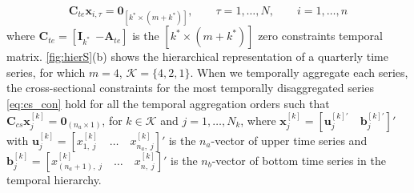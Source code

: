 \documentclass[12pt]{article}
\newcommand{\bvet}{\bm{b}}
\newcommand{\uvet}{\bm{u}}
\newcommand{\xvet}{\bm{x}}
\newcommand{\Avet}{\bm{A}}
\newcommand{\Cvet}{\bm{C}}
\newcommand{\Ivet}{\bm{I}}
\newcommand{\Svet}{\bm{S}}
\newcommand{\Zerovet}{\bm{0}}
\theoremstyle{definition}
\begin{document}
\begin{equation}
	\label{eq:te_con}
	\Cvet_{te}\xvet_{i,\tau} = \Zerovet_{[k^\ast \times (m+k^\ast)]}, \qquad \tau = 1,\dots,N, \qquad i = 1,\dots, n
\end{equation}
where $\Cvet_{te} = [\Ivet_{k^\ast} ~~ {-\Avet_{te}}]$ is the $[k^\ast \times (m+k^\ast)]$ zero constraints temporal matrix. \autoref{fig:hierS}(b) shows the hierarchical representation of a quarterly time series, for which $m = 4$, $\mathcal{K} = \{4,2,1\}$.%
When we temporally aggregate each series, the cross-sectional constraints for the most temporally disaggregated series \eqref{eq:cs_con} hold for all the temporal aggregation orders such that $\Cvet_{cs}\xvet^{[k]}_j = \Zerovet_{(n_a \times 1)}$, for $k \in \mathcal{K}$ and $j = 1, \dots, N_k$, where $\xvet_j^{[k]} = \left[\uvet_j^{[k]\prime}\quad \bvet_j^{[k]\prime}\right]'$ with $\uvet^{[k]}_j = \left[ x^{[k]}_{1,\;j}\quad \dots\quad x^{[k]}_{n_a,\;j}\right]'$ is the $n_a$-vector of upper time series and $\bvet^{[k]}_j = \left[x^{[k]}_{(n_a+1),\;j}\quad\dots\quad x^{[k]}_{n,\;j}\right]'$ is the $n_b$-vector of bottom time series in the temporal hierarchy.
\end{document}
